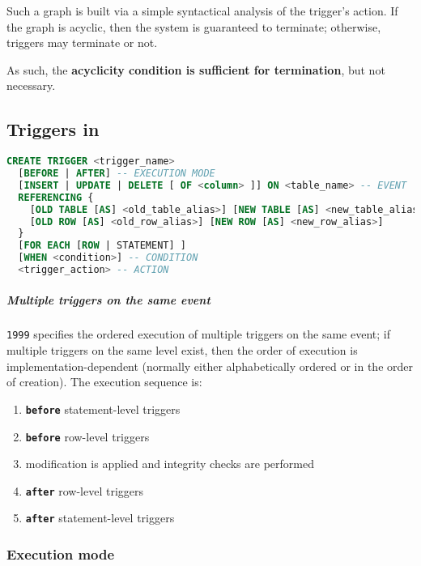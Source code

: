 \documentclass[english]{article}
\begin{document}
Such a graph is built via a simple syntactical analysis of the trigger's action.
If the graph is acyclic, then the system is guaranteed to terminate;
otherwise, triggers may terminate or not.

As such, the \textbf{acyclicity condition is sufficient for termination}, but not necessary.

\subsection{Triggers in \sql}

\begin{minipage}{\textwidth}
  \bigskip
  \begin{lstlisting}[language=SQL, caption={Trigger Syntax}, label={lst:trigger-syntax}]
CREATE TRIGGER <trigger_name>
  [BEFORE | AFTER] -- EXECUTION MODE
  [INSERT | UPDATE | DELETE [ OF <column> ]] ON <table_name> -- EVENT
  REFERENCING {
    [OLD TABLE [AS] <old_table_alias>] [NEW TABLE [AS] <new_table_alias>] |
    [OLD ROW [AS] <old_row_alias>] [NEW ROW [AS] <new_row_alias>]
  }
  [FOR EACH [ROW | STATEMENT] ]
  [WHEN <condition>] -- CONDITION
  <trigger_action> -- ACTION
\end{lstlisting}
\end{minipage}

\subparagraph*{Multiple triggers on the same event}
\sql \texttt{1999} specifies the ordered execution of multiple triggers on the same event;
if multiple triggers on the same level exist, then the order of execution is implementation-dependent (normally either alphabetically ordered or in the order of creation).
The execution sequence is:

\begin{enumerate}
  \item \textbf{\texttt{before}} statement-level triggers
  \item \textbf{\texttt{before}} row-level triggers
  \item modification is applied and integrity checks are performed
  \item \textbf{\texttt{after}} row-level triggers
  \item \textbf{\texttt{after}} statement-level triggers
\end{enumerate}

\subsubsection{Execution mode}
\end{document}

